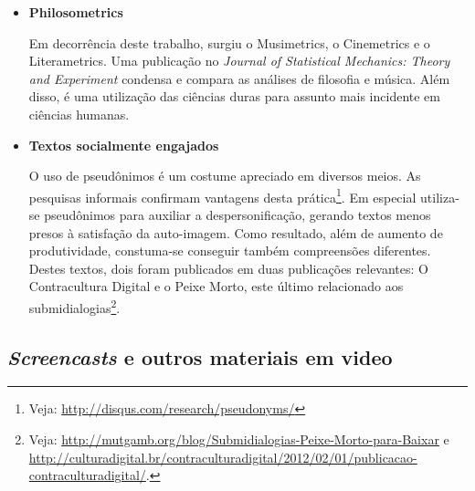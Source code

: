 \begin{itemize}
    \item {\bf Philosometrics}

Em decorrência deste trabalho, surgiu o  Musimetrics,
o Cinemetrics e o Literametrics. Uma publicação no
\emph{Journal of Statistical Mechanics: Theory and Experiment}
condensa e compara as análises de filosofia
e música.\cite{FabbriSTAT}
Além disso, é uma
utilização das ciências duras para 
assunto mais incidente em ciências humanas. 

    \item {\bf Textos socialmente engajados }

O uso de pseudônimos é um costume apreciado em diversos meios. As pesquisas informais confirmam vantagens desta prática\footnote{Veja: \url{http://disqus.com/research/pseudonyms/}}.
Em especial utiliza-se pseudônimos para
auxiliar a despersonificação, gerando textos menos presos à satisfação da auto-imagem. Como resultado, além de aumento de produtividade, constuma-se conseguir também compreensões diferentes. Destes textos, dois foram publicados em duas publicações relevantes: O Contracultura Digital e o Peixe Morto, este último relacionado aos submidialogias\footnote{Veja: \url{http://mutgamb.org/blog/Submidialogias-Peixe-Morto-para-Baixar} e \url{http://culturadigital.br/contraculturadigital/2012/02/01/publicacao-contraculturadigital/}.}.

 \end{itemize}

 \subsection{\emph{Screencasts} e outros materiais em video}

